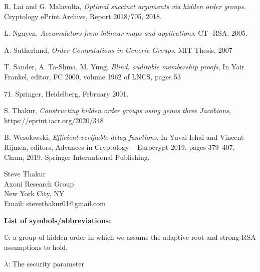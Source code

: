 \documentclass[11pt, lettersize, notitlepage, leqno, footskip=0.6cm]{article}
\newcommand{\mb}{\mathbb}
\newcommand{\lam}{\lambda}
\newcommand{\noin}{\noindent}
\numberwithin{equation}{section}
\begin{document}
\noin [LM18] R. Lai and G. Malavolta,  \textit{Optimal succinct arguments
via hidden order groups}. Cryptology ePrint Archive, Report 2018/705,
2018.

\noin [Ngu05] L. Nguyen. \textit{Accumulators from bilinear maps and applications}. CT-
RSA, 2005. \vspace{0.1cm}

\noindent [Sut07] A. Sutherland, \textit{Order Computations in Generic Groups}, MIT Thesis, 2007 \vspace{0.1cm}

\noindent [STY01] T. Sander, A. Ta-Shma, M. Yung, \textit{Blind, auditable membership proofs}, In Yair Frankel, editor, FC 2000, volume 1962 of LNCS, pages 53{71. Springer, Heidelberg, February 2001.\vspace{0.1cm}


\noindent [Th20] S. Thakur, \textit{Constructing hidden order groups using genus three Jacobians}, https://eprint.iacr.org/2020/348\vspace{0.1cm} 

\noindent [Wes19] B. Wesolowski, \textit{Efficient verifiable delay functions}. In Yuval Ishai and Vincent Rijmen, editors, Advances in Cryptology – Eurocrypt 2019, pages 379–407, Cham, 2019. Springer International Publishing.\vspace{0.1cm}




\bigskip

\normalsize
\noindent Steve Thakur\\
Axoni Research Group\\
New York City, NY\\
Email: stevethakur01@gmail.com


\newpage


\begin{center}\textbf{List of symbols/abbreviations:}\end{center}

\noindent $\mb{G}$: a group of hidden order in which we assume the adaptive root and strong-RSA assumptions to hold. \vspace{0.1cm}

\noindent $\lam$: The security parameter \vspace{0.1cm}

}
\end{document}
